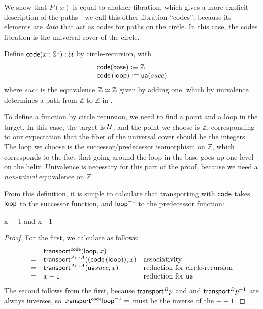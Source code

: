We show that $P(x)$ is equal to another fibration, which gives a more
explicit description of the paths---we call this other fibration
``codes'', because its elements are \emph{data} that act as codes for
paths on the circle.  In this case, the codes fibration is the universal
cover of the circle.

\begin{defn}
Define $\mathsf{code}(x:\mathbb{S} ^1) : \mathcal{U}$ by circle-recursion, with 
\[
\begin{array}{l}
\mathsf{code}(\mathsf{base}) \vcentcolon\equiv \mathbb{Z} \\
{\mathsf{code}}\left({\mathsf{loop}}\right) \vcentcolon\equiv \mathsf{ua}(succ) \\
\end{array}
\]
where $succ$ is the equivalence $\mathbb{Z} \simeq \mathbb{Z}$ given by
adding one, which by univalence determines a path from $\mathbb{Z}$ to
$\mathbb{Z}$ in \type.  
\end{defn}

To define a function by circle recursion, we need to find a point and a
loop in the target.  In this case, the target is $\mathcal{U}$, and the point
we choose is $\mathbb{Z}$, corresponding to our expectation that the
fiber of the universal cover should be the integers.  The loop we choose
is the successor/predecessor isomorphism on $\mathbb{Z}$, which
corresponds to the fact that going around the loop in the base goes up
one level on the helix.  Univalence is necessary for this part of the
proof, because we need a \emph{non-trivial} equivalence on $\mathbb{Z}$.  

From this definition, it is simple to calculate that transporting with
$\mathsf{code}$ takes $\mathsf{loop}$ to the successor function, and 
$\mathord{{\mathsf{loop}}^{-1}}$ to the predecessor function:
\begin{lem} \label{lem:transport-s1-code}
 {x + 1} and 
 {x - 1}
\end{lem}
\begin{proof}
For the first, we calculate as follows:
\[
\begin{array}{lll}
 & {\mathsf{transport}^{\mathsf{code}}(\mathsf{loop},x)} &\\
= & \mathsf{transport}^{A \mapsto A}(({\mathsf{code}}\left({\mathsf{loop}}\right)),x) & \text{associativity}\\
= & \mathsf{transport}^{A \mapsto A}(\mathsf{ua} succ,x) & \text{reduction for circle-recursion}\\
= & x + 1 & \text{reduction for \ensuremath{\mathsf{ua}}}
\end{array}
\]
The second follows from the first, because 
$\mathsf{transport}^{B} p$ and 
and ${\mathsf{transport}^{B} {\mathord{{p}^{-1}}}}$ are always inverses, so 
$\id{\transfibf \code {\opp \lloop}}$ must be the inverse of the
$- + 1$.  
\end{proof}

